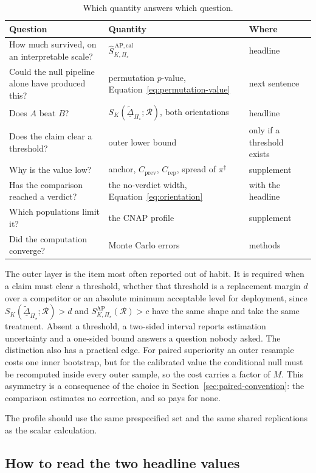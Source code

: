 \documentclass[11pt]{article}
\newcommand{\Regime}{\mathcal{R}}
\newcommand{\PSet}{\Pi_\star}
\newcommand{\SRob}{S_{K,\PSet}^{\mathrm{AP}}(\Regime)}
\newcommand{\SRobCalHat}{\widehat S_{K,\PSet}^{\,\mathrm{AP,cal}}}
\newcommand{\RobDta}{\underline{\widetilde{\Delta}}_{\PSet}}
\theoremstyle{remark}
\begin{document}
\begin{table}[ht]
\centering
\caption{Which quantity answers which question.}
\label{tab:reporting}
\begin{tabularx}{\textwidth}{@{}XXl@{}}
\toprule
Question & Quantity & Where \\
\midrule
How much survived, on an interpretable scale? & $\SRobCalHat$ & headline \\
Could the null pipeline alone have produced this? & permutation $p$-value, Equation~\eqref{eq:permutation-value} & next sentence \\
Does $A$ beat $B$? & $S_K(\RobDta;\Regime)$, both orientations & headline \\
Does the claim clear a threshold? & outer lower bound & only if a threshold exists \\
Why is the value low? & anchor, $C_{\mathrm{prev}}$, $C_{\mathrm{rep}}$, spread of $\pi^\dagger$ & supplement \\
Has the comparison reached a verdict? & the no-verdict width, Equation~\eqref{eq:orientation} & with the headline \\
Which populations limit it? & the CNAP profile & supplement \\
Did the computation converge? & Monte Carlo errors & methods \\
\bottomrule
\end{tabularx}
\end{table}

The outer layer is the item most often reported out of habit. It is required when a claim must clear a threshold, whether that threshold is a replacement margin $d$ over a competitor or an absolute minimum acceptable level for deployment, since $S_K(\RobDta;\Regime)>d$ and $\SRob>c$ have the same shape and take the same treatment. Absent a threshold, a two-sided interval reports estimation uncertainty and a one-sided bound answers a question nobody asked. The distinction also has a practical edge. For paired superiority an outer resample costs one inner bootstrap, but for the calibrated value the conditional null must be recomputed inside every outer sample, so the cost carries a factor of $M$. This asymmetry is a consequence of the choice in Section~\ref{sec:paired-convention}: the comparison estimates no correction, and so pays for none.

The profile should use the same prespecified set and the same shared replications as the scalar calculation.

\subsection{How to read the two headline values}
\end{document}

